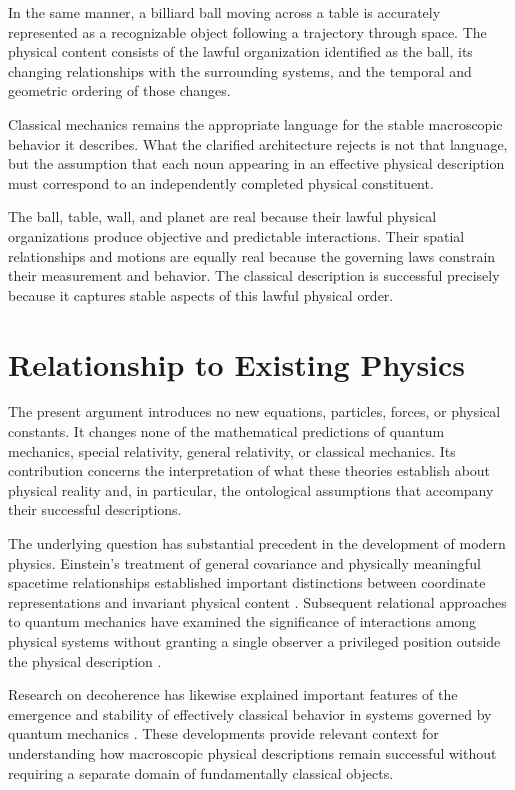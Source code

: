 \documentclass[12pt,onecolumn]{article}
\begin{document}
In the same manner, a billiard ball moving across a table is accurately represented as a recognizable object following a trajectory through space. The physical content consists of the lawful organization identified as the ball, its changing relationships with the surrounding systems, and the temporal and geometric ordering of those changes.

Classical mechanics remains the appropriate language for the stable macroscopic behavior it describes. What the clarified architecture rejects is not that language, but the assumption that each noun appearing in an effective physical description must correspond to an independently completed physical constituent.

The ball, table, wall, and planet are real because their lawful physical organizations produce objective and predictable interactions. Their spatial relationships and motions are equally real because the governing laws constrain their measurement and behavior. The classical description is successful precisely because it captures stable aspects of this lawful physical order.

\section{Relationship to Existing Physics}

The present argument introduces no new equations, particles, forces, or physical constants. It changes none of the mathematical predictions of quantum mechanics, special relativity, general relativity, or classical mechanics. Its contribution concerns the interpretation of what these theories establish about physical reality and, in particular, the ontological assumptions that accompany their successful descriptions.

The underlying question has substantial precedent in the development of modern physics. Einstein's treatment of general covariance and physically meaningful spacetime relationships established important distinctions between coordinate representations and invariant physical content \cite{Einstein1916}. Subsequent relational approaches to quantum mechanics have examined the significance of interactions among physical systems without granting a single observer a privileged position outside the physical description \cite{Rovelli1996}.

Research on decoherence has likewise explained important features of the emergence and stability of effectively classical behavior in systems governed by quantum mechanics \cite{Zurek2003}. These developments provide relevant context for understanding how macroscopic physical descriptions remain successful without requiring a separate domain of fundamentally classical objects.
\end{document}
